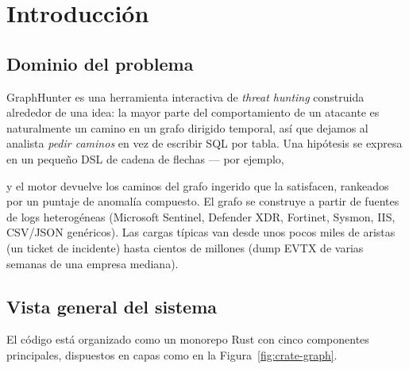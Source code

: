 \chapter{Introducción}
\label{ch:intro}

\section{Dominio del problema}

GraphHunter es una herramienta interactiva de \emph{threat hunting}
construida alrededor de una idea: la mayor parte del comportamiento
de un atacante es naturalmente un camino en un grafo dirigido
temporal, así que dejamos al analista \emph{pedir caminos} en vez
de escribir SQL por tabla. Una hipótesis se expresa en un pequeño
DSL de cadena de flechas --- por ejemplo,

\begin{center}
\end{center}

y el motor devuelve los caminos del grafo ingerido que la
satisfacen, rankeados por un puntaje de anomalía compuesto. El
grafo se construye a partir de fuentes de logs heterogéneas
(Microsoft Sentinel, Defender XDR, Fortinet, Sysmon, IIS, CSV/JSON
genéricos). Las cargas típicas van desde unos pocos miles de
aristas (un ticket de incidente) hasta cientos de millones (dump
EVTX de varias semanas de una empresa mediana).

\section{Vista general del sistema}

El código está organizado como un monorepo Rust con cinco
componentes principales, dispuestos en capas como en la
Figura~\ref{fig:crate-graph}.

